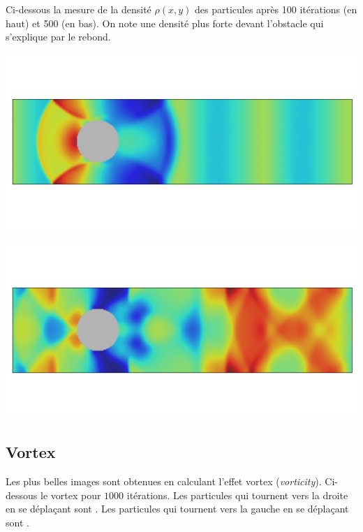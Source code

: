\documentclass[11pt,class=report,crop=false]{standalone}
\begin{document}
 Ci-dessous la mesure de la densité $\rho(x,y)$ des particules après 100 itérations (en haut) et 500 (en bas). On note une densité plus forte devant l'obstacle qui s'explique par le rebond.
\begin{center}
	\includegraphics[scale=\myscale,scale=0.5,trim={0 3cm 0 3cm},clip]{figures/fluide-densite-100}
	
	\includegraphics[scale=\myscale,scale=0.5,trim={0 3cm 0 3cm},clip]{figures/fluide-densite-500}			
\end{center}



\subsection{Vortex}

Les plus belles images sont obtenues en calculant l'effet vortex (\emph{vorticity}).
Ci-dessous le vortex pour $1000$ itérations. Les particules qui tournent vers la droite en se déplaçant sont . Les particules qui tournent vers la gauche en se déplaçant sont .

\end{document}
